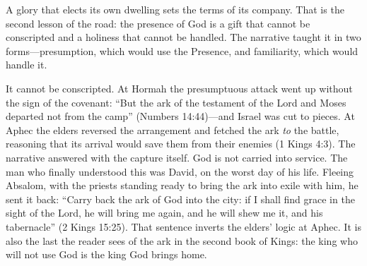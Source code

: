 A glory that elects its own dwelling sets the terms of its company.
That is the second lesson of the road: the presence of God is a gift
that cannot be conscripted and a holiness that cannot be handled. The
narrative taught it in two forms---presumption, which would use the
Presence, and familiarity, which would handle it.

It cannot be conscripted. At Hormah the presumptuous attack went up
without the sign of the covenant: ``But the ark of the testament of the
Lord and Moses departed not from the camp'' (Numbers 14:44)---and
Israel was cut to pieces.
At Aphec the elders reversed the arrangement and fetched the ark
\emph{to} the battle, reasoning that its arrival would save them
from their enemies (1 Kings 4:3). The narrative answered with the
capture itself. God is not carried into service. The man who finally
understood this was David, on the worst day of his life. Fleeing
Absalom, with the priests standing ready to bring the ark into exile
with him, he sent it back: ``Carry back the ark of God into the city:
if I shall find grace in the sight of the Lord, he will bring me again,
and he will shew me it, and his tabernacle'' (2 Kings
15:25). That sentence
inverts the elders' logic at Aphec. It is also the last the reader sees
of the ark in the second book of Kings: the king who will not use God
is the king God brings home.

